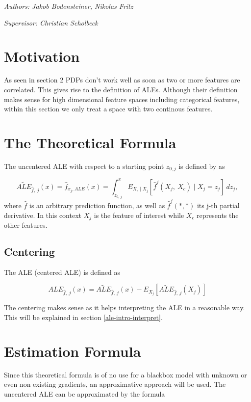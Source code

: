 \documentclass[]{krantz}
\begin{document}
\emph{Authors: Jakob Bodensteiner, Nikolas Fritz}

\emph{Supervisor: Christian Scholbeck}

\section{Motivation}\label{motivation-1}

As seen in section 2 PDPs don't work well as soon as two or more
features are correlated. This gives rise to the definition of ALEs.
Although their definition makes sense for high dimensional feature
spaces including categorical features, within this section we only treat
a space with two continous features.

\section{The Theoretical Formula}\label{ale-intro-formula}

The uncentered ALE with respect to a starting point \(z_{0, j}\) is
defined by \citep{Apley2016} as

\[  \widetilde{ALE}_{\hat{f},~j}(x) = \hat{f}_{x_j,ALE}(x) = \int_{z_{0,~j}}^{x} E_{X_c \mid X_j} [\hat{f}^j(X_j,~X_c)\mid X_j = z_j]~dz_j,\]
where \(\hat{f}\) is an arbitrary prediction function, as well as
\(\hat{f}^j(*,*)\) its j-th partial derivative. In this context \(X_j\)
is the feature of interest while \(X_c\) represents the other features.

\subsection{Centering}\label{centering}

The ALE (centered ALE) is defined as

\[  ALE_{\hat{f},~j}(x) = \widetilde{ALE}_{\hat{f},~j}(x) - E_{X_j}[\widetilde{ALE}_{\hat{f},~j}(X_j)]\]

The centering makes sense as it helps interpreting the ALE in a
reasonable way. This will be explained in section
\ref{ale-intro-interpret}.

\section{Estimation Formula}\label{estimation-formula}

Since this theoretical formula is of no use for a blackbox model with
unknown or even non existing gradients, an approximative approach will
be used. The uncentered ALE can be approximated by the formula
\end{document}
